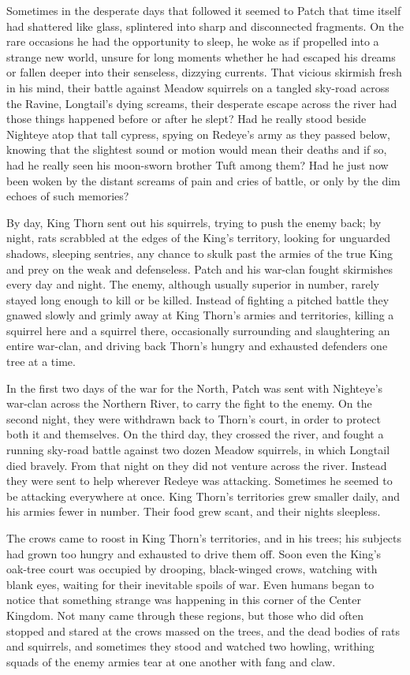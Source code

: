 \documentclass[12pt]{book}
\begin{document}
 Sometimes in the desperate days that followed it seemed to Patch that time itself had shattered like glass, splintered into sharp and disconnected fragments. On the rare occasions he had the opportunity to sleep, he woke as if propelled into a strange new world, unsure for long moments whether he had escaped his dreams or fallen deeper into their senseless, dizzying currents. That vicious skirmish fresh in his mind, their battle against Meadow squirrels on a tangled sky-road across the Ravine, Longtail's dying screams, their desperate escape across the river %
 had those things happened before or after he slept? Had he really stood beside Nighteye atop that tall cypress, spying on Redeye's army as they passed below, knowing that the slightest sound or motion would mean their deaths %
 and if so, had he really seen his moon-sworn brother Tuft among them? Had he just now been woken by the distant screams of pain and cries of battle, or only by the dim echoes of such memories?\par
 By day, King Thorn sent out his squirrels, trying to push the enemy back; by night, rats scrabbled at the edges of the King's territory, looking for unguarded shadows, sleeping sentries, any chance to skulk past the armies of the true King and prey on the weak and defenseless. Patch and his war-clan fought skirmishes every day and night. The enemy, although usually superior in number, rarely stayed long enough to kill or be killed. Instead of fighting a pitched battle they gnawed slowly and grimly away at King Thorn's armies and territories, killing a squirrel here and a squirrel there, occasionally surrounding and slaughtering an entire war-clan, and driving back Thorn's hungry and exhausted defenders one tree at a time.\par
 In the first two days of the war for the North, Patch was sent with Nighteye's war-clan across the Northern River, to carry the fight to the enemy. On the second night, they were withdrawn back to Thorn's court, in order to protect both it and themselves. On the third day, they crossed the river, and fought a running sky-road battle against two dozen Meadow squirrels, in which Longtail died bravely. From that night on they did not venture across the river. Instead they were sent to help wherever Redeye was attacking. Sometimes he seemed to be attacking everywhere at once. King Thorn's territories grew smaller daily, and his armies fewer in number. Their food grew scant, and their nights sleepless.\par
 The crows came to roost in King Thorn's territories, and in his trees; his subjects had grown too hungry and exhausted to drive them off. Soon even the King's oak-tree court was occupied by drooping, black-winged crows, watching with blank eyes, waiting for their inevitable spoils of war. Even humans began to notice that something strange was happening in this corner of the Center Kingdom. Not many came through these regions, but those who did often stopped and stared at the crows massed on the trees, and the dead bodies of rats and squirrels, and sometimes they stood and watched two howling, writhing squads of the enemy armies tear at one another with fang and claw.\par
\end{document}
